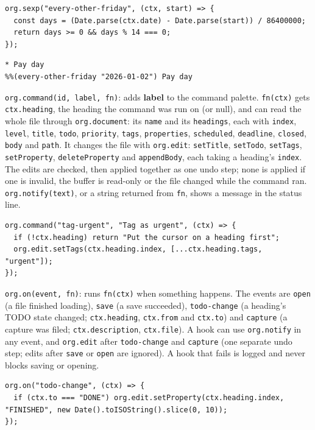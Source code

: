 \documentclass[11pt]{article}
\begin{document}
\begin{verbatim}
org.sexp("every-other-friday", (ctx, start) => {
  const days = (Date.parse(ctx.date) - Date.parse(start)) / 86400000;
  return days >= 0 && days % 14 === 0;
});
\end{verbatim}

\begin{verbatim}
* Pay day
%%(every-other-friday "2026-01-02") Pay day
\end{verbatim}

\texttt{org.command(id, label, fn)}: adds \textbf{label} to the command palette. \texttt{fn(ctx)} gets \texttt{ctx.heading}, the heading the command was run on (or null), and can read the whole file through \texttt{org.document}: its \texttt{name} and its \texttt{headings}, each with \texttt{index}, \texttt{level}, \texttt{title}, \texttt{todo}, \texttt{priority}, \texttt{tags}, \texttt{properties}, \texttt{scheduled}, \texttt{deadline}, \texttt{closed}, \texttt{body} and \texttt{path}. It changes the file with \texttt{org.edit}: \texttt{setTitle}, \texttt{setTodo}, \texttt{setTags}, \texttt{setProperty}, \texttt{deleteProperty} and \texttt{appendBody}, each taking a heading's \texttt{index}. The edits are checked, then applied together as one undo step; none is applied if one is invalid, the buffer is read-only or the file changed while the command ran. \texttt{org.notify(text)}, or a string returned from \texttt{fn}, shows a message in the status line.

\begin{verbatim}
org.command("tag-urgent", "Tag as urgent", (ctx) => {
  if (!ctx.heading) return "Put the cursor on a heading first";
  org.edit.setTags(ctx.heading.index, [...ctx.heading.tags, "urgent"]);
});
\end{verbatim}

\texttt{org.on(event, fn)}: runs \texttt{fn(ctx)} when something happens. The events are \texttt{open} (a file finished loading), \texttt{save} (a save succeeded), \texttt{todo-change} (a heading's TODO state changed; \texttt{ctx.heading}, \texttt{ctx.from} and \texttt{ctx.to}) and \texttt{capture} (a capture was filed; \texttt{ctx.description}, \texttt{ctx.file}). A hook can use \texttt{org.notify} in any event, and \texttt{org.edit} after \texttt{todo-change} and \texttt{capture} (one separate undo step; edits after \texttt{save} or \texttt{open} are ignored). A hook that fails is logged and never blocks saving or opening.

\begin{verbatim}
org.on("todo-change", (ctx) => {
  if (ctx.to === "DONE") org.edit.setProperty(ctx.heading.index, "FINISHED", new Date().toISOString().slice(0, 10));
});
\end{verbatim}
\end{document}
